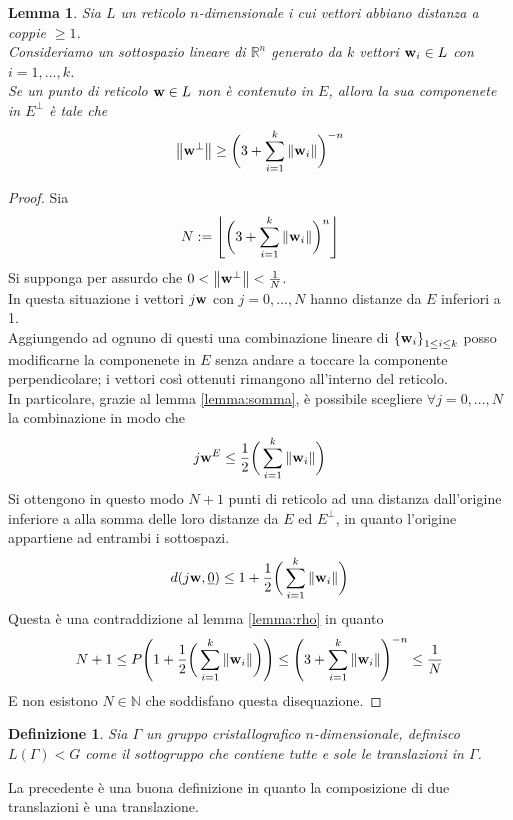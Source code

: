 \documentclass[a4paper]{book}
\newtheorem{definition}{Definizione}[section]
\newtheorem{lemma}[theorem]{Lemma}
\begin{document}
\begin{lemma}
\label{lemma:somma2}
Sia $L$ un reticolo $n$-dimensionale i cui vettori abbiano distanza a coppie $\geq 1$. \\ Consideriamo un sottospazio lineare di $\mathbb{R}^n$ generato da $k$ vettori $\vb{w}_i \in L$ con $i = 1,... ,k$. \\
Se un punto di reticolo $\vb{w} \in L$ non è contenuto in $E$, allora la sua componenete in $E^{\perp}$ è tale che 
\[ \norm{\vb{w}^{\perp}} \geq \bigg( 3 +  \sum_{i = 1}^{k} \norm{\vb{w}_i} \bigg)^{-n} \]
\end{lemma}

\begin{proof}
Sia \[ N := \left\lfloor
\bigg( 3 +  \sum_{i = 1}^{k} \norm{\vb{w}_i} \bigg)^{n}
\right\rfloor\]
Si supponga per assurdo che $0 < \norm{\vb{w}^{\perp}}  < \frac{1}{N}$. \\
In questa situazione i vettori $j \vb{w}$ con $j = 0, ..., N$ hanno distanze da $E$ inferiori a 1. \\
Aggiungendo ad ognuno di questi una combinazione lineare di ${\{\vb{w}_i\}}_{1 \leq i \leq k }$ posso modificarne la componenete in $E$ senza andare a toccare la componente perpendicolare; i vettori così ottenuti rimangono all'interno del reticolo. \\
In particolare, grazie al lemma \ref{lemma:somma}, è possibile scegliere $\forall j = 0, ..., N$ la combinazione in modo che \[ j \vb{w}^{E} \leq \frac{1}{2} \bigg( \sum_{i = 1}^{k} \norm{\vb{w}_i} \bigg)  \]  
Si ottengono in questo modo $N+1$ punti di reticolo ad una distanza dall'origine inferiore a alla somma delle loro distanze da $E$ ed $E^{\perp}$, in quanto l'origine appartiene ad entrambi i sottospazi.
\[ d(j\vb{w}, \underline{0} ) \leq 1 + \frac{1}{2} \bigg( \sum_{i = 1}^{k} \norm{\vb{w}_i} \bigg) \]
Questa è una contraddizione al lemma \ref{lemma:rho} in quanto 
\[ N+1 \leq P \Bigg( 1 + \frac{1}{2} \bigg( \sum_{i = 1}^{k} \norm{\vb{w}_i} \bigg) \Bigg)  \leq \Bigg( 3 +  \sum_{i = 1}^{k} \norm{\vb{w}_i} \Bigg)^{-n} \leq  \frac{1}{N} \]
E non esistono $N \in \mathbb{N}$ che soddisfano questa disequazione.
\end{proof}


\begin{definition}
Sia $\Gamma$ un gruppo cristallografico $n$-dimensionale, definisco $L(\Gamma)<G$ come il sottogruppo che contiene tutte e sole le translazioni in $\Gamma$.
\end{definition}

La precedente è una buona definizione in quanto la composizione di due translazioni è una translazione. 
\end{document}
